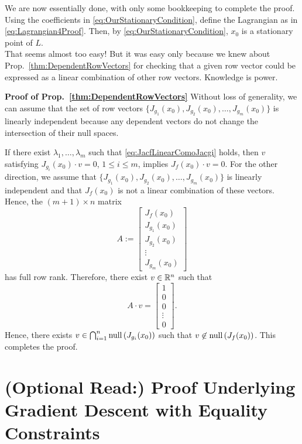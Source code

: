 We are now essentially done, with only some bookkeeping to complete the proof. Using the coefficients in \eqref{eq:OurStationaryCondition}, define the Lagrangian as in \eqref{eq:Lagrangian4Proof}. 
Then, by \eqref{eq:OurStationaryCondition}, $x_0$ is a stationary point of $L$.\\

That seems almost too easy! But it was easy only because we knew about Prop.~\ref{thm:DependentRowVectors} for checking that a given row vector could be expressed as a linear combination of other row vectors. Knowledge is power. 

\Qed

\textbf{ Proof of Prop.~\ref{thm:DependentRowVectors} } Without loss of generality, we can assume that the set of row vectors $\{ J_{g_1}(x_0), J_{g_2}(x_0), \ldots, J_{g_m}(x_0) \}$ is linearly independent because any dependent vectors do not change the intersection of their null spaces.

If there exist $\lambda_1, \ldots, \lambda_m$ such that \eqref{eq:JacfLinearComoJacgi} holds, then $v$ satisfying $J_{g_i}(x_0) \cdot v = 0$, $1 \le i \le m$, implies 
$J_f(x_0) \cdot v=0.$ For the other direction, we assume that $\{ J_{g_1}(x_0), J_{g_2}(x_0), \ldots, J_{g_m}(x_0) \}$ is linearly independent and that $J_f(x_0)$ is not a linear combination of these vectors. Hence, the $ (m+1)\times n$ matrix
$$A:= \left[ \begin{array}{c} 
J_f(x_0) \\
   J_{g_1}(x_0)\\  
    J_{g_2}(x_0)\\
    \vdots \\
    J_{g_m}(x_0)
    \end{array} \right] $$
    has full row rank. Therefore, there exist $v\in \mathbb R^n$ such that 
    $$A \cdot v = \left[ \begin{array}{c} 
1\\
   0\\  
    0\\
    \vdots \\
    0
    \end{array} \right].$$
    Hence, there exists $v \in  \bigcap_{i=1}^n \mathrm{null}\left(  J_{g_i}(x_0) \right) $ such that $v \not \in \mathrm{null}\left( J_f(x_0) \right)$. This completes the proof.
    \Qed
\bigskip

\section{(Optional Read:) Proof Underlying Gradient Descent with Equality Constraints}

